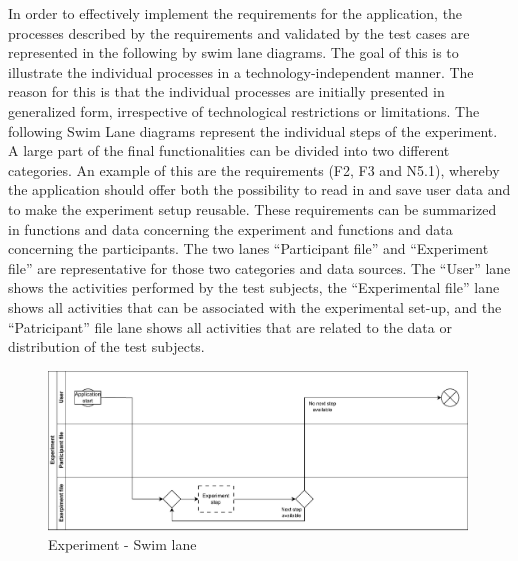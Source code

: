 In order to effectively implement the requirements for the application, the processes described by the requirements and validated by the test cases are represented in the following by swim lane diagrams. The goal of this is to illustrate the individual processes in a technology-independent manner. The reason for this is that the individual processes are initially presented in generalized form, irrespective of technological restrictions or limitations. The following Swim Lane diagrams represent the individual steps of the experiment. A large part of the final functionalities can be divided into two different categories. An example of this are the requirements (F2, F3 and N5.1), whereby the application should offer both the possibility to read in and save user data and to make the experiment setup reusable. These requirements can be summarized in functions and data concerning the experiment and functions and data concerning the participants. The two lanes \enquote{Participant file} and \enquote{Experiment file} are representative for those two categories and data sources. The \enquote{User} lane shows the activities performed by the test subjects, the \enquote{Experimental file} lane shows all activities that can be associated with the experimental set-up, and the \enquote{Patricipant} file lane shows all activities that are related to the data or distribution of the test subjects. 

\begin{figure}[htbp]
    \includegraphics[width=0.99\textwidth, keepaspectratio]{content/05_design_and_dev_artefacts/ExperimentSwimLane.drawio.pdf}
    \caption{Experiment - Swim lane}    
    \label{fig:experimentSwimLane}
\end{figure}

